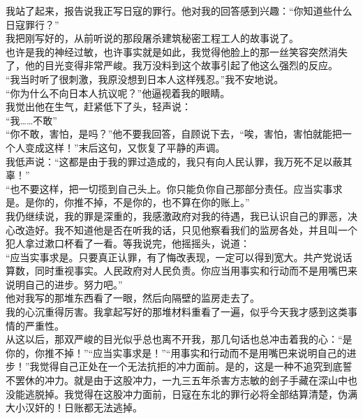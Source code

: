 我站了起来，报告说我正写日寇的罪行。他对我的回答感到兴趣：“你知道些什么日寇罪行？”\\

我把刚写好的，从前听说的那段屠杀建筑秘密工程工人的故事说了。\\

也许是我的神经过敏，也许事实就是如此，我觉得他脸上的那一丝笑容突然消失了，他的目光变得非常严峻。我万没料到这个故事引起了他这么强烈的反应。\\

“我当时听了很刺激，我原没想到日本人这样残忍。”我不安地说。\\

“你为什么不向日本人抗议呢？”他逼视着我的眼睛。\\

我觉出他在生气，赶紧低下了头，轻声说：\\

“我……不敢”\\

“你不敢，害怕，是吗？”他不要我回答，自顾说下去，“唉，害怕，害怕就能把一个人变成这样！”末后这句，又恢复了平静的声调。\\

我低声说：“这都是由于我的罪过造成的，我只有向人民认罪，我万死不足以蔽其辜！”\\

“也不要这样，把一切揽到自己头上。你只能负你自己那部分责任。应当实事求是。是你的，你推不掉，不是你的，也不算在你的账上。”\\

我仍继续说，我的罪是深重的，我感激政府对我的待遇，我已认识自己的罪恶，决心改造好。我不知道他是否在听我的话，只见他察看我们的监房各处，并且叫一个犯人拿过漱口杯看了一看。等我说完，他摇摇头，说道：\\

“应当实事求是。只要真正认罪，有了悔改表现，一定可以得到宽大。共产党说话算数，同时重视事实。人民政府对人民负责。你应当用事实和行动而不是用嘴巴来说明自己的进步。努力吧。”\\

他对我写的那堆东西看了一眼，然后向隔壁的监房走去了。\\

我的心沉重得厉害。我拿起写好的那堆材料重看了一遍，似乎今天我才感到这类事情的严重性。\\

从这以后，那双严峻的目光似乎总也离不开我，那几句话也总冲击着我的心：“是你的，你推不掉！”“应当实事求是！”“用事实和行动而不是用嘴巴来说明自己的进步！”我觉得自己正处在一个无法抗拒的冲力面前。是的，这是一种不追究到底誓不罢休的冲力。就是由于这股冲力，一九三五年杀害方志敏的刽子手藏在深山中也没能逃脱掉。我觉得在这股冲力面前，日寇在东北的罪行必将全部结算清楚，伪满大小汉奸的！日账都无法逃掉。\\

